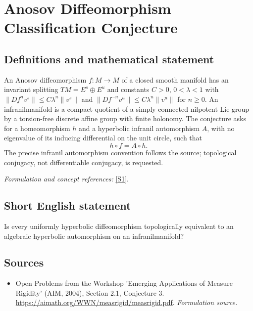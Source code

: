\documentclass[11pt]{article}
\begin{document}
\section*{\texorpdfstring{Anosov Diffeomorphism Classification Conjecture}{Anosov Diffeomorphism Classification Conjecture}}\label{255}
\subsection{Definitions and mathematical statement}
An Anosov diffeomorphism $f:M\to M$ of a closed smooth manifold has an invariant splitting $TM=E^s\oplus E^u$ and constants $C>0$, $0<\lambda<1$ with
$\|Df^nv^s\|\le C\lambda^n\|v^s\|$ and
$\|Df^{-n}v^u\|\le C\lambda^n\|v^u\|$ for $n\ge0$.
An infranilmanifold is a compact quotient of a simply connected nilpotent Lie group by a torsion-free discrete affine group with finite holonomy. The conjecture asks for a homeomorphism $h$ and a hyperbolic infranil automorphism $A$, with no eigenvalue of its inducing differential on the unit circle, such that
\[
 h\circ f=A\circ h.
\]
The precise infranil automorphism convention follows the source; topological conjugacy, not differentiable conjugacy, is requested.
\par\smallskip\textit{Formulation and concept references:} \href{https://aimath.org/WWN/measrigid/measrigid.pdf}{[S1]}.

\subsection{Short English statement}
Is every uniformly hyperbolic diffeomorphism topologically equivalent to an algebraic hyperbolic automorphism on an infranilmanifold?
\subsection{Sources}
\begin{itemize}
\item[S1]Open Problems from the Workshop 'Emerging Applications of Measure Rigidity' (AIM, 2004), Section 2.1, Conjecture 3.
\url{https://aimath.org/WWN/measrigid/measrigid.pdf}.
\textit{Formulation source.}
\end{itemize}
\end{document}
